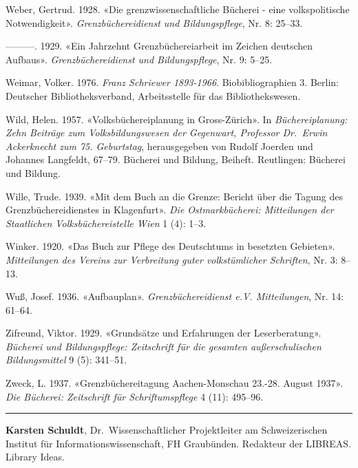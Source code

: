 \documentclass[a4paper,
fontsize=11pt,
oneside,
numbers=noperiodatend,
parskip=half-,
bibliography=totoc,
final
]{scrartcl}
\begin{document}
Weber, Gertrud. 1928. «Die grenzwissenschaftliche Bücherei - eine
volkspolitische Notwendigkeit». \emph{Grenzbüchereidienst und
Bildungspflege}, Nr. 8: 25--33.

---------. 1929. «Ein Jahrzehnt Grenzbüchereiarbeit im Zeichen deutschen
Aufbaus». \emph{Grenzbüchereidienst und Bildungspflege}, Nr. 9: 5--25.

Weimar, Volker. 1976. \emph{Franz Schriewer 1893-1966}.
Biobibliographien 3. Berlin: Deutscher Bibliotheksverband, Arbeitsstelle
für das Bibliothekswesen.

Wild, Helen. 1957. «Volksbüchereiplanung in Gross-Zürich». In
\emph{Büchereiplanung: Zehn Beiträge zum Volksbildungswesen der
Gegenwart, Professor Dr.~Erwin Ackerknecht zum 75. Geburtstag},
herausgegeben von Rudolf Joerden und Johannes Langfeldt, 67--79.
Bücherei und Bildung, Beiheft. Reutlingen: Bücherei und Bildung.

Wille, Trude. 1939. «Mit dem Buch an die Grenze: Bericht über die Tagung
des Grenzbüchereidienstes in Klagenfurt». \emph{Die Ostmarkbücherei:
Mitteilungen der Staatlichen Volksbüchereistelle Wien} 1 (4): 1--3.

Winker. 1920. «Das Buch zur Pflege des Deutschtums in besetzten
Gebieten». \emph{Mitteilungen des Vereins zur Verbreitung guter
volkstümlicher Schriften}, Nr. 3: 8--13.

Wuß, Josef. 1936. «Aufbauplan». \emph{Grenzbüchereidienst e.V.
Mitteilungen}, Nr. 14: 61--64.

Zifreund, Viktor. 1929. «Grundsätze und Erfahrungen der Leserberatung».
\emph{Bücherei und Bildungspflege: Zeitschrift für die gesamten
außerschulischen Bildungsmittel} 9 (5): 341--51.

Zweck, L. 1937. «Grenzbüchereitagung Aachen-Monschau 23.-28. August
1937». \emph{Die Bücherei: Zeitschrift für Schriftumspflege} 4 (11):
495--96.

\begin{center}\rule{0.5\linewidth}{0.5pt}\end{center}

\textbf{Karsten Schuldt}, Dr.~Wissenschaftlicher Projektleiter am
Schweizerischen Institut für Informationswissenschaft, FH Graubünden.
Redakteur der LIBREAS. Library Ideas.
\end{document}

